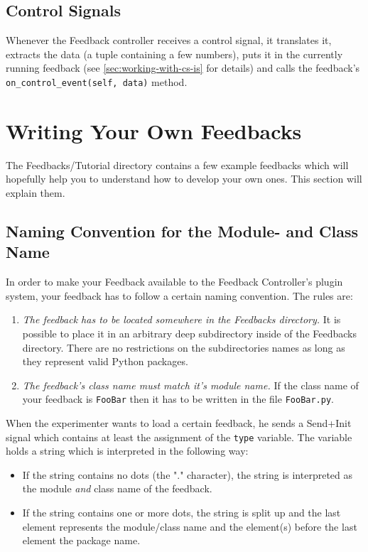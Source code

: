 \subsection{Control Signals}\label{sec:cs}
Whenever the Feedback controller receives a control signal, it translates it, extracts the data (a tuple containing a few numbers), puts it in the currently running feedback (see \ref{sec:working-with-cs-is} for details) and calls the feedback's \lstinline+on_control_event(self, data)+ method.

\section{Writing Your Own Feedbacks}
\label{ref:writing-your-own-feedbacks}
The Feedbacks/Tutorial directory contains a few example feedbacks which will hopefully help you to understand how to develop your own ones. This section will explain them.

\subsection{Naming Convention for the Module- and Class Name}\label{sec:namingconvention}
In order to make your Feedback available to the Feedback Controller's plugin system, your feedback has to follow a certain naming convention. The rules are:
\begin{enumerate}
\item \textit{The feedback has to be located somewhere in the Feedbacks directory.} It is possible to place it in an arbitrary deep subdirectory inside of the Feedbacks directory. There are no restrictions on the subdirectories names as long as they represent valid Python packages.
\item \textit{The feedback's class name must match it's module name.} If the class name of your feedback is \lstinline+FooBar+ then it has to be written in the file \verb+FooBar.py+.
\end{enumerate}


When the experimenter wants to load a certain feedback, he sends a Send+Init signal which contains at least the assignment of the \lstinline+type+ variable. The variable holds a string which is interpreted in the following way: 
\begin{itemize}
\item If the string contains no dots (the "." character), the string is interpreted as the module \textit{and} class name of the feedback.
\item If the string contains one or more dots, the string is split up and the last element represents the module/class name and the element(s) before the last element the package name.
\end{itemize}

